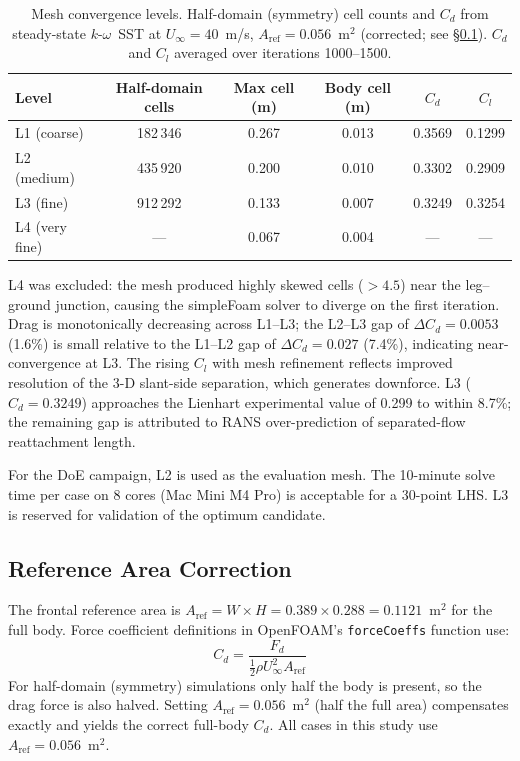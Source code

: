 \begin{table}[h]
    \centering
    \caption{Mesh convergence levels. Half-domain (symmetry) cell counts and $C_d$ from steady-state $k$-$\omega$~SST at $U_\infty = 40$~m/s, $A_\mathrm{ref}=0.056$~m$^2$ (corrected; see \S\ref{sec:aref}). $C_d$ and $C_l$ averaged over iterations 1000--1500.}
    \label{tab:mesh_levels}
    \begin{tabular}{lccccc}
        \toprule
        Level & Half-domain cells & Max cell (m) & Body cell (m) & $C_d$ & $C_l$ \\
        \midrule
        L1 (coarse)    & 182\,346   & 0.267 & 0.013 & 0.3569 & 0.1299 \\
        L2 (medium)    & 435\,920   & 0.200 & 0.010 & 0.3302 & 0.2909 \\
        L3 (fine)      & 912\,292   & 0.133 & 0.007 & 0.3249 & 0.3254 \\
        L4 (very fine) & ---        & 0.067 & 0.004 & --- & --- \\
        \bottomrule
    \end{tabular}
\end{table}

L4 was excluded: the mesh produced highly skewed cells ($>4.5$) near the leg--ground junction, causing the simpleFoam solver to diverge on the first iteration. Drag is monotonically decreasing across L1--L3; the L2--L3 gap of $\Delta C_d = 0.0053$ (1.6\%) is small relative to the L1--L2 gap of $\Delta C_d = 0.027$ (7.4\%), indicating near-convergence at L3. The rising $C_l$ with mesh refinement reflects improved resolution of the 3-D slant-side separation, which generates downforce.  L3 ($C_d = 0.3249$) approaches the Lienhart experimental value of 0.299 to within 8.7\%; the remaining gap is attributed to RANS over-prediction of separated-flow reattachment length.

For the DoE campaign, L2 is used as the evaluation mesh. The 10-minute solve time per case on 8 cores (Mac Mini M4 Pro) is acceptable for a 30-point LHS. L3 is reserved for validation of the optimum candidate.

\subsection{Reference Area Correction}
\label{sec:aref}

The frontal reference area is $A_\mathrm{ref} = W \times H = 0.389 \times 0.288 = 0.1121$~m$^2$ for the full body. Force coefficient definitions in OpenFOAM's \texttt{forceCoeffs} function use:
\[
    C_d = \frac{F_d}{\tfrac{1}{2}\rho U_\infty^2 A_\mathrm{ref}}
\]
For half-domain (symmetry) simulations only half the body is present, so the drag force is also halved. Setting $A_\mathrm{ref} = 0.056$~m$^2$ (half the full area) compensates exactly and yields the correct full-body $C_d$. All cases in this study use $A_\mathrm{ref} = 0.056$~m$^2$.

